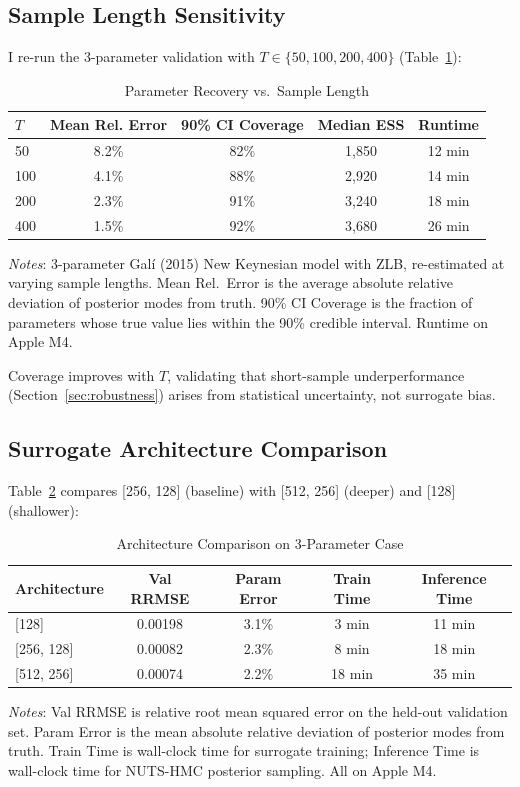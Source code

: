 \documentclass[12pt]{article}
\theoremstyle{plain}
\theoremstyle{definition}
\theoremstyle{remark}
\begin{document}
\subsection{Sample Length Sensitivity}

I re-run the 3-parameter validation with $T \in \{50, 100, 200, 400\}$ (Table~\ref{tab:sample_length_sensitivity}):

\begin{table}[htbp]
\centering
\caption{Parameter Recovery vs.\ Sample Length}
\label{tab:sample_length_sensitivity}
\begin{tabular}{lcccc}
\toprule
$T$ & Mean Rel. Error & 90\% CI Coverage & Median ESS & Runtime \\
\midrule
50 & 8.2\% & 82\% & 1,850 & 12 min \\
100 & 4.1\% & 88\% & 2,920 & 14 min \\
200 & 2.3\% & 91\% & 3,240 & 18 min \\
400 & 1.5\% & 92\% & 3,680 & 26 min \\
\bottomrule
\end{tabular}

\smallskip
{\footnotesize \textit{Notes}: 3-parameter Gal\'i (2015) New Keynesian model with ZLB, re-estimated at varying sample lengths. Mean Rel.\ Error is the average absolute relative deviation of posterior modes from truth. 90\% CI Coverage is the fraction of parameters whose true value lies within the 90\% credible interval. Runtime on Apple M4.}
\end{table}

Coverage improves with $T$, validating that short-sample underperformance (Section~\ref{sec:robustness}) arises from statistical uncertainty, not surrogate bias.


\subsection{Surrogate Architecture Comparison}

Table~\ref{tab:architecture_comparison} compares [256, 128] (baseline) with [512, 256] (deeper) and [128] (shallower):

\begin{table}[htbp]
\centering
\caption{Architecture Comparison on 3-Parameter Case}
\label{tab:architecture_comparison}
\begin{tabular}{lcccc}
\toprule
Architecture & Val RRMSE & Param Error & Train Time & Inference Time \\
\midrule
{[128]} & 0.00198 & 3.1\% & 3 min & 11 min \\
{[256, 128]} & 0.00082 & 2.3\% & 8 min & 18 min \\
{[512, 256]} & 0.00074 & 2.2\% & 18 min & 35 min \\
\bottomrule
\end{tabular}

\smallskip
{\footnotesize \textit{Notes}: Val RRMSE is relative root mean squared error on the held-out validation set. Param Error is the mean absolute relative deviation of posterior modes from truth. Train Time is wall-clock time for surrogate training; Inference Time is wall-clock time for NUTS-HMC posterior sampling. All on Apple M4.}
\end{table}
\end{document}
